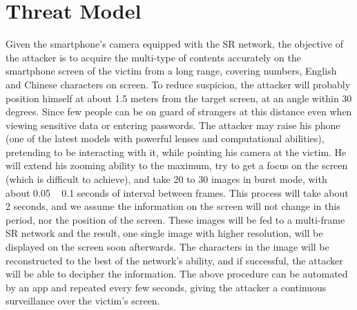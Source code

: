 \section{Threat Model}
\label{sec-threat-model} 
Given the smartphone’s camera equipped with the SR network, the objective of the attacker is to acquire the multi-type of contents accurately on the smartphone screen of the victim from a long range, covering numbers, English and Chinese characters on screen. To reduce suspicion, the attacker will probably position himself at about 1.5 meters from the target screen, at an angle within 30 degrees. Since few people can be on guard of strangers at this distance even when viewing sensitive data or entering passwords. The attacker may raise his phone (one of the latest models with powerful lenses and computational abilities), pretending to be interacting with it, while pointing his camera at the victim. He will extend his zooming ability to the maximum, try to get a focus on the screen (which is difficult to achieve), and take 20 to 30 images in burst mode, with about 0.05 ~ 0.1 seconds of interval between frames. This process will take about 2 seconds, and we assume the information on the screen will not change in this period, nor the position of the screen. These images will be fed to a multi-frame SR network and the result, one single image with higher resolution, will be displayed on the screen soon afterwards. The characters in the image will be reconstructed to the best of the network’s ability, and if successful, the attacker will be able to decipher the information. The above procedure can be automated by an app and repeated every few seconds, giving the attacker a continuous surveillance over the victim’s screen.
